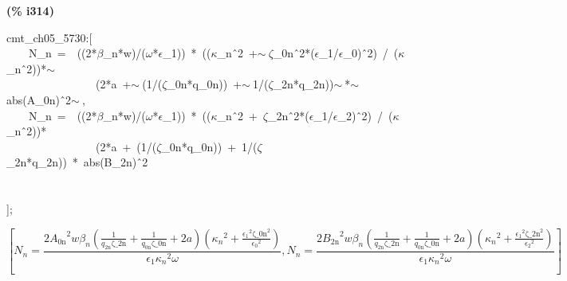 \documentclass[fleqn]{article}
\begin{document}
\noindent
\begin{minipage}[t]{4.000000em}\color{red}\bfseries
(\% i314)	
\end{minipage}
\begin{minipage}[t]{\textwidth}\color{blue}
cmt\_ch05\_5730:[\\
\ \ \ \ N\_n\ =\ \ ((2*\ensuremath{\beta}\_n*w)/(\ensuremath{\omega}*\ensuremath{\epsilon}\_1))\ *\ ((\ensuremath{\kappa}\_n\^\ 2\ +\ensuremath{\sim\ }\ensuremath{\zeta}\_0n\^\ 2*(\ensuremath{\epsilon}\_1/\ensuremath{\epsilon}\_0)\^\ 2)\ /\ (\ensuremath{\kappa}\_n\^\ 2))*\ensuremath{\sim\ }\\
\ \ \ \ \ \ \ \ \ \ \ \ \ \ \ \ (2*a\ +\ensuremath{\sim\ }(1/(\ensuremath{\zeta}\_0n*q\_0n))\ +\ensuremath{\sim\ }1/(\ensuremath{\zeta}\_2n*q\_2n))\ensuremath{\sim\ }*\ensuremath{\sim\ }abs(A\_0n)\^\ 2\ensuremath{\sim\ },\\
\ \ \ \ N\_n\ =\ \ ((2*\ensuremath{\beta}\_n*w)/(\ensuremath{\omega}*\ensuremath{\epsilon}\_1))\ *\ ((\ensuremath{\kappa}\_n\^\ 2\ +\ \ensuremath{\zeta}\_2n\^\ 2*(\ensuremath{\epsilon}\_1/\ensuremath{\epsilon}\_2)\^\ 2)\ /\ (\ensuremath{\kappa}\_n\^\ 2))*\ \\
\ \ \ \ \ \ \ \ \ \ \ \ \ \ \ \ (2*a\ +\ (1/(\ensuremath{\zeta}\_0n*q\_0n))\ +\ 1/(\ensuremath{\zeta}\_2n*q\_2n))\ *\ abs(B\_2n)\^\ 2\ \\
\\
\ \ \ \ \\
];
\end{minipage}
\[\displaystyle \tag{\% o314} 
\operatorname{[}{N_n}=\frac{2 {{{A_{\ensuremath{\mathrm{0n}}}}}^{2}} w {{\beta }_n} \left( \frac{1}{{q_{\ensuremath{\mathrm{2n}}}} \ensuremath{\mathrm{\zeta \_ 2n}}}+\frac{1}{{q_{\ensuremath{\mathrm{0n}}}} \ensuremath{\mathrm{\zeta \_ 0n}}}+2 a\right)  \left( {{{{\kappa }_n}}^{2}}+\frac{{{{{\epsilon }_1}}^{2}} {{\ensuremath{\mathrm{\zeta \_ 0n}}}^{2}}}{{{{{\epsilon }_0}}^{2}}}\right) }{{{\epsilon }_1} {{{{\kappa }_n}}^{2}} \omega }\operatorname{,}{N_n}=
\frac{2 {{{B_{\ensuremath{\mathrm{2n}}}}}^{2}} w {{\beta }_n} \left( \frac{1}{{q_{\ensuremath{\mathrm{2n}}}} \ensuremath{\mathrm{\zeta \_ 2n}}}+\frac{1}{{q_{\ensuremath{\mathrm{0n}}}} \ensuremath{\mathrm{\zeta \_ 0n}}}+2 a\right)  \left( {{{{\kappa }_n}}^{2}}+\frac{{{{{\epsilon }_1}}^{2}} {{\ensuremath{\mathrm{\zeta \_ 2n}}}^{2}}}{{{{{\epsilon }_2}}^{2}}}\right) }{{{\epsilon }_1} {{{{\kappa }_n}}^{2}} \omega }\operatorname{]}\mbox{}
\]
\end{document}
